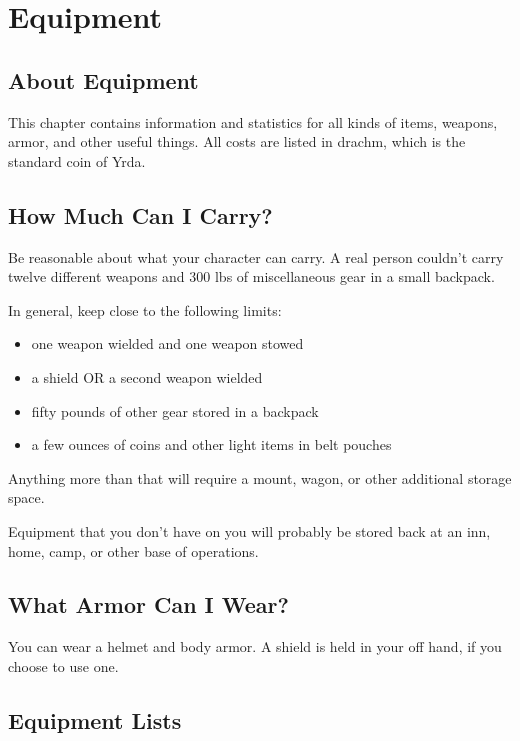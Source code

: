 \chapter{Equipment}

\begin{multicols}{2}

\section{About Equipment}

This chapter contains information and statistics for all kinds
of items, weapons, armor, and other useful things. All costs
are listed in drachm, which is the standard coin of Yrda.

\section{How Much Can I Carry?}

Be reasonable about what your character can carry. A real person
couldn't carry twelve different weapons and 300 lbs of miscellaneous
gear in a small backpack.

In general, keep close to the following limits:

\begin{itemize}
  \item one weapon wielded and one weapon stowed
  \item a shield OR a second weapon wielded
  \item fifty pounds of other gear stored in a backpack
  \item a few ounces of coins and other light items in belt pouches
\end{itemize}

Anything more than that will require a mount, wagon, or other
additional storage space.

Equipment that you don't have on you will probably be stored
back at an inn, home, camp, or other base of operations.

\section{What Armor Can I Wear?}

You can wear a helmet and body armor. A shield is held in your
off hand, if you choose to use one.

\section{Equipment Lists}


\end{multicols}
